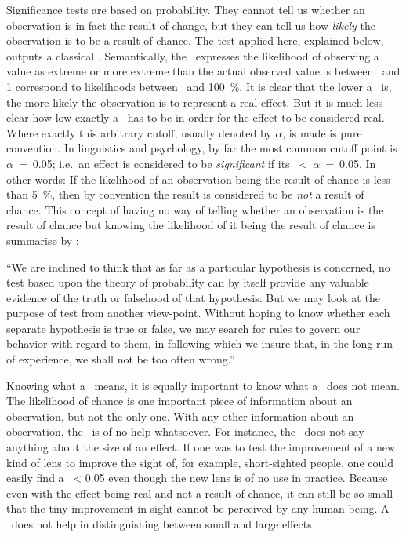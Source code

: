Significance tests are based on probability.
They cannot tell us whether an observation is in fact the result of change, but they can tell us how \emph{likely} the observation is to be a result of chance.
The test applied here, explained below, outputs a classical \pv.
Semantically, the \pv\ expresses the likelihood of observing a value as extreme or more extreme than the actual observed value.
\pvupper s between \null\ and 1 correspond to likelihoods between \zero\ and 100~\%.
It is clear that the lower a \pv\ is, the more likely the observation is to represent a real effect.
But it is much less clear how low exactly a \pv\ has to be in order for the effect to be considered real.
Where exactly this arbitrary cutoff, usually denoted by \(\alpha\), is made is pure convention.
In linguistics and psychology, by far the most common cutoff point is \(\alpha\)~=~0.05; i.e.~an effect is considered to be \emph{significant} if its \pv~<~\(\alpha\)~=~0.05.
In other words:
If the likelihood of an observation being the result of chance is less than 5~\%, then by convention the result is considered to be \emph{not} a result of chance.
This concept of having no way of telling whether an observation is the result of chance but knowing the likelihood of it being the result of chance is summarise by \citet[]{neyman_problem_1933}:

\begin{customquote}
``We are inclined to think that as far as a particular hypothesis is concerned, no test based upon the theory of probability can by itself provide any valuable evidence of the truth or falsehood of that hypothesis.
But we may look at the purpose of test from another view-point.
Without hoping to know whether each separate hypothesis is true or false, we may search for rules to govern our behavior with regard to them, in following which we insure that, in the long run of experience, we shall not be too often wrong.''
\end{customquote}

Knowing what a \pv\ means, it is equally important to know what a \pv\ does not mean.
The likelihood of chance is one important piece of information about an observation, but not the only one.
With any other information about an observation, the \pv\ is of no help whatsoever.
For instance, the \pv\ does not say anything about the size of an effect.
If one was to test the improvement of a new kind of lens to improve the sight of, for example, short-sighted people, one could easily find a \pv\ < 0.05 even though the new lens is of no use in practice.
Because even with the effect being real and not a result of chance, it can still be so small that the tiny improvement in sight cannot be perceived by any human being.
A \pv\ does not help in distinguishing between small and large effects \citep[]{frost_statistische_2017}.


